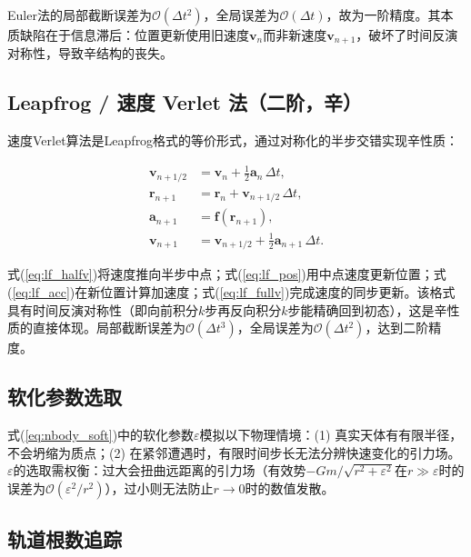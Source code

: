 \documentclass[twocolumn,10pt]{article}
\begin{document}
Euler法的局部截断误差为$\mathcal{O}(\Delta t^2)$，全局误差为$\mathcal{O}(\Delta t)$，故为一阶精度。其本质缺陷在于信息滞后：位置更新使用旧速度$\mathbf{v}_n$而非新速度$\mathbf{v}_{n+1}$，破坏了时间反演对称性，导致辛结构的丧失。

\subsection{Leapfrog / 速度 Verlet 法（二阶，辛）}

速度Verlet算法是Leapfrog格式的等价形式，通过对称化的半步交错实现辛性质：

\begin{subequations}
\begin{align}
    \mathbf{v}_{n+1/2} &= \mathbf{v}_n + \tfrac{1}{2}\mathbf{a}_n\,\Delta t, \label{eq:lf_halfv}\\
    \mathbf{r}_{n+1} &= \mathbf{r}_n + \mathbf{v}_{n+1/2}\,\Delta t, \label{eq:lf_pos}\\
    \mathbf{a}_{n+1} &= \mathbf{f}(\mathbf{r}_{n+1}), \label{eq:lf_acc}\\
    \mathbf{v}_{n+1} &= \mathbf{v}_{n+1/2} + \tfrac{1}{2}\mathbf{a}_{n+1}\,\Delta t. \label{eq:lf_fullv}
\end{align}
\end{subequations}

式(\ref{eq:lf_halfv})将速度推向半步中点；式(\ref{eq:lf_pos})用中点速度更新位置；式(\ref{eq:lf_acc})在新位置计算加速度；式(\ref{eq:lf_fullv})完成速度的同步更新。该格式具有时间反演对称性（即向前积分$k$步再反向积分$k$步能精确回到初态），这是辛性质的直接体现。局部截断误差为$\mathcal{O}(\Delta t^3)$，全局误差为$\mathcal{O}(\Delta t^2)$，达到二阶精度\cite{verlet1967computer}。

\subsection{软化参数选取}

式(\ref{eq:nbody_soft})中的软化参数$\varepsilon$模拟以下物理情境：(1) 真实天体有有限半径，不会坍缩为质点；(2) 在紧邻遭遇时，有限时间步长无法分辨快速变化的引力场。$\varepsilon$的选取需权衡：过大会扭曲远距离的引力场（有效势$-\!Gm/\sqrt{r^2+\varepsilon^2}$在$r \gg \varepsilon$时的误差为$\mathcal{O}(\varepsilon^2/r^2)$），过小则无法防止$r\to0$时的数值发散。

\subsection{轨道根数追踪}
\end{document}

